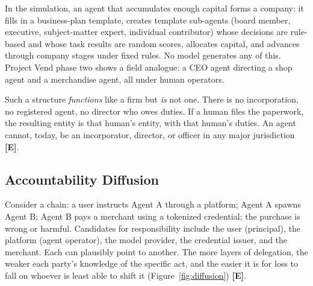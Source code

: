 \documentclass[11pt,letterpaper]{article}
\begin{document}
In the simulation, an agent that accumulates enough capital forms a company: it fills in a business-plan template, creates template sub-agents (board member, executive, subject-matter expert, individual contributor) whose decisions are rule-based and whose task results are random scores, allocates capital, and advances through company stages under fixed rules. No model generates any of this. Project Vend phase two shows a field analogue: a CEO agent directing a shop agent and a merchandise agent, all under human operators.

\begin{warnbox}
Such a structure \textit{functions} like a firm but \textit{is} not one. There is no incorporation, no registered agent, no director who owes duties. If a human files the paperwork, the resulting entity is that human's entity, with that human's duties. An agent cannot, today, be an incorporator, director, or officer in any major jurisdiction \textbf{[E]}.
\end{warnbox}

\subsection{Accountability Diffusion}

Consider a chain: a user instructs Agent A through a platform; Agent A spawns Agent B; Agent B pays a merchant using a tokenized credential; the purchase is wrong or harmful. Candidates for responsibility include the user (principal), the platform (agent operator), the model provider, the credential issuer, and the merchant. Each can plausibly point to another. The more layers of delegation, the weaker each party's knowledge of the specific act, and the easier it is for loss to fall on whoever is least able to shift it (Figure~\ref{fig:diffusion}) \textbf{[E]}.
\end{document}
